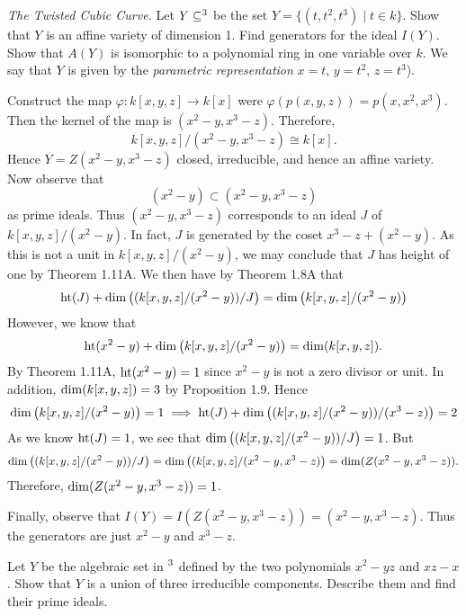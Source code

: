 \documentclass{/Users/SHER/Documents/Hartshorne-Exercises/hw_pset} %
\DeclareMathOperator{\Ht}{\rm{ht}}    %
\DeclareMathOperator{\Dim}{\rm{dim}}  %
\let\aa\relax
\DeclareMathOperator{\aa}{\mathbf{A}} %
\renewcommand{\phi}{\varphi}
\begin{document}
\begin{exercise}[1.2]
    \emph{The Twisted Cubic Curve.}
    Let $Y \subseteq \aa^3$ be the set $Y = \{(t,t^2,t^3) \mid t \in k\}$.
    Show that $Y$ is an affine variety of dimension 1. Find generators 
    for the ideal $I(Y)$. Show that $A(Y)$ is isomorphic to a polynomial ring 
    in one variable over $k$. We say that $Y$ is given by the \emph{parametric representation} 
    $x = t$, $y = t^2$, $z = t^3$). 
\end{exercise}

\begin{solution}
    Construct the map $\phi: k[x,y,z] \to k[x]$ were 
    $\phi(p(x, y, z)) = p(x, x^2, x^3)$. Then the kernel of the 
    map is $(x^2 - y, x^3 - z)$. Therefore, 
    \[
        k[x,y,z]/(x^2 - y, x^3 - z) \cong k[x]. 
    \]
    Hence $Y = Z(x^2 -y, x^3 - z)$ closed, irreducible, and hence an affine 
    variety. 
    Now observe that 
    \[
        (x^2 - y) \subset (x^2 - y, x^3 - z)
    \]
    as prime ideals. Thus $(x^2 - y, x^3 - z)$ corresponds to 
    an ideal $J$ of $k[x,y,z]/(x^2 - y)$. In fact, $J$ is generated by 
    the coset $x^3 - z + (x^2 - y)$. As this is not a unit in $k[x,y,z]/(x^2 - y)$, 
    we may conclude that $J$ has height of one by Theorem 1.11A. We then have by 
    Theorem 1.8A that 
    \[
        \Ht(J) + \Dim\left( (k[x,y,z]/(x^2 - y))/J \right) = \Dim\left( k[x,y,z]/(x^2 - y) \right)
    \]
    However, we know that 
    \[
        \Ht(x^2 - y) + \Dim\left( k[x,y,z]/(x^2 - y) \right) = \Dim( k[x,y,z]).
    \]
    By Theorem 1.11A, $\Ht(x^2 - y) = 1$ since $x^2 - y$ is not a zero divisor or unit.
    In addition, $\Dim(k[x,y,z]) = 3$ by Proposition 1.9. Hence 
    \[
        \Dim\left( k[x,y,z]/(x^2 - y) \right) = 1 \implies 
        \Ht(J) + \Dim\left( (k[x,y,z]/(x^2 - y))/(x^3 - z) \right)
        = 2
    \]
    As we know $\Ht(J) = 1$, we see that 
    $\Dim\left( (k[x,y,z]/(x^2 - y))/J \right) = 1$. 
    But 
    \[
        \Dim\left( (k[x,y,z]/(x^2 - y))/J \right) = 
        \Dim\left( (k[x,y,z]/(x^2 - y, x^3 - z) \right) 
        = \Dim(Z(x^2 - y, x^3 - z)).
    \]
    Therefore, $\Dim(Z(x^2 - y, x^3 - z)) = 1$. 

    Finally, observe that $I(Y) = I(Z(x^2-y, x^3 - z)) = (x^2 - y, x^3 - z)$. 
    Thus the generators are just $x^2 - y$ and $x^3 - z$. 




\end{solution}

\begin{exercise}[1.3]
    Let $Y$ be the algebraic set in $\aa^3$ defined by the two polynomials
    $x^2 - yz$ and $xz - x$.
    Show that $Y$ is a union of three irreducible components.
    Describe them and find their prime ideals.
\end{exercise}
\end{document}
